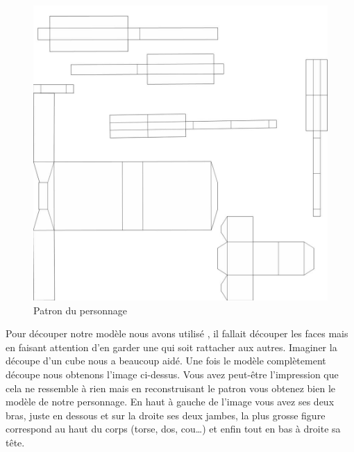 \documentclass{article}
\begin{document}
\begin{figure}[t]
\begin{center}
\includegraphics[scale=0.3]{decoupe.jpg}
\caption{Patron du personnage}
\end{center}
\end{figure}

\newpage

\par
Pour découper notre modèle nous avons utilisé , il fallait découper les faces mais en faisant attention d’en garder une qui soit rattacher aux autres. Imaginer la découpe d’un cube nous a beaucoup aidé. Une fois le modèle complètement découpe nous obtenons l’image ci-dessus.         
Vous avez peut-être l’impression que cela ne ressemble à rien mais en reconstruisant le patron vous obtenez bien le modèle de notre personnage. En haut à gauche de l’image vous avez ses deux bras, juste en dessous et sur la droite ses deux jambes, la plus grosse figure correspond au haut du corps (torse, dos, cou…) et enfin tout en bas à droite sa tête.
\end{document}

